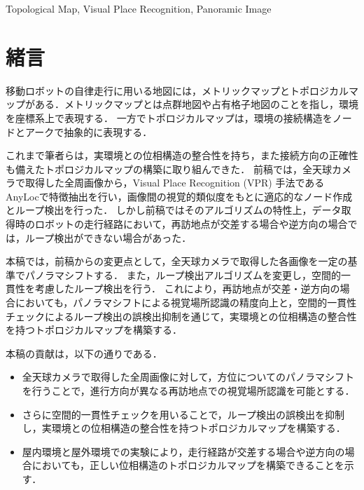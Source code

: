 \documentclass[conference]{IEEEtran}
\begin{document}
\begin{IEEEkeywords}
Topological Map, Visual Place Recognition, Panoramic Image
\end{IEEEkeywords}

\section{緒言}
移動ロボットの自律走行に用いる地図には，メトリックマップとトポロジカルマップがある．メトリックマップとは点群地図や占有格子地図のことを指し，環境を座標系上で表現する．
一方でトポロジカルマップは，環境の接続構造をノードとアークで抽象的に表現する．

これまで筆者らは，実環境との位相構造の整合性を持ち，また接続方向の正確性も備えたトポロジカルマップの構築に取り組んできた\cite{ref:robosym_ogiwara}\cite{ref:SII2026_nakao}．
前稿\cite{ref:robosym_ogiwara}では，全天球カメラで取得した全周画像から，Visual Place Recognition (VPR) 手法である AnyLoc\cite{ref:AnyLoc}で特徴抽出を行い，画像間の視覚的類似度をもとに適応的なノード作成とループ検出を行った．
しかし前稿\cite{ref:robosym_ogiwara}ではそのアルゴリズムの特性上，データ取得時のロボットの走行経路において，再訪地点が交差する場合や逆方向の場合では，ループ検出ができない場合があった．

本稿では，前稿\cite{ref:robosym_ogiwara}からの変更点として，全天球カメラで取得した各画像を一定の基準でパノラマシフトする．
また，ループ検出アルゴリズムを変更し，空間的一貫性を考慮したループ検出を行う．
これにより，再訪地点が交差・逆方向の場合においても，パノラマシフトによる視覚場所認識の精度向上と，空間的一貫性チェックによるループ検出の誤検出抑制を通じて，実環境との位相構造の整合性を持つトポロジカルマップを構築する．


本稿の貢献は，以下の通りである．
\begin{itemize}
  \item 全天球カメラで取得した全周画像に対して，方位についてのパノラマシフトを行うことで，進行方向が異なる再訪地点での視覚場所認識を可能とする．
  \item さらに空間的一貫性チェックを用いることで，ループ検出の誤検出を抑制し，実環境との位相構造の整合性を持つトポロジカルマップを構築する．
  \item 屋内環境と屋外環境での実験により，走行経路が交差する場合や逆方向の場合においても，正しい位相構造のトポロジカルマップを構築できることを示す．
\end{itemize}
\end{document}
